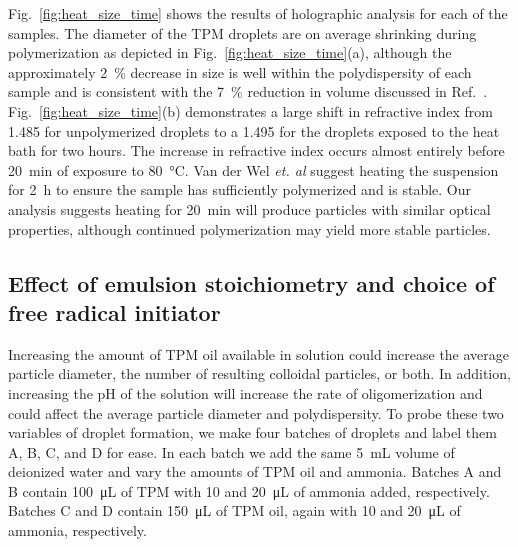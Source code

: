 Fig.~\ref{fig:heat_size_time} shows the results of holographic analysis
for each of the samples. The diameter of the TPM droplets are on average shrinking
during polymerization as depicted in Fig.~\ref{fig:heat_size_time}(a),
although the approximately \SI{2}{\percent} decrease in size is well within the
polydispersity of each sample and is consistent with the \SI{7}{\percent} reduction
in volume discussed in Ref.~\cite{vanderwel17}.
Fig.~\ref{fig:heat_size_time}(b) demonstrates a large shift in refractive index
from \SI{1.485}{} for unpolymerized droplets to a \SI{1.495}{} for the droplets
exposed to the heat bath for two hours. The increase in refractive index occurs almost
entirely before \SI{20}{\minute} of exposure to \SI{80}{\degreeCelsius}.
Van der Wel \emph{et. al} \cite{vanderwel17} suggest heating the suspension
for \SI{2}{\hour} to ensure the sample has sufficiently polymerized and is
stable. Our analysis suggests heating for \SI{20}{\minute} will produce
particles with similar optical properties, although continued polymerization
may yield more stable particles.

\subsection{Effect of emulsion stoichiometry and choice of free radical initiator}

Increasing the amount of TPM oil available in solution could increase the
average particle diameter, the number of resulting colloidal particles, or both.
In addition, increasing the pH of the solution will increase the rate of
oligomerization and could affect the average particle diameter and polydispersity.
To probe these two variables of droplet formation, we make four batches of droplets
and label them A, B, C, and D for ease.
In each batch we add the same \SI{5}{\milli \liter} volume of deionized water
and vary the amounts of TPM oil and ammonia. Batches A and B contain
\SI{100}{\micro\liter} of TPM with \si{10} and \SI{20}{\micro\liter} of 
ammonia added, respectively. Batches C and D contain \SI{150}{\micro\liter} of TPM oil, 
again with \si{10} and \SI{20}{\micro\liter} of ammonia, respectively. 


